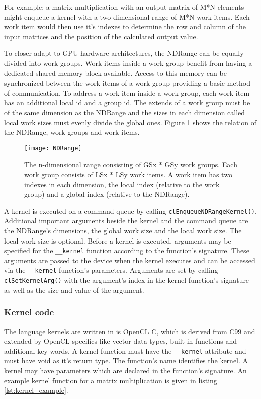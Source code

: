 For example: a matrix multiplication with an output matrix of M*N elements might enqueue a kernel with a two-dimensional range of M*N work items. Each work item would then use it's indexes to determine the row and column of the input matrices and the position of the calculated output value.

To closer adapt to GPU hardware architectures, the NDRange can be equally divided into work groups. Work items inside a work group benefit from having a dedicated shared memory block available. Access to this memory can be synchronized between the work items of a work group providing a basic method of communication. To address a work item inside a work group, each work item has an additional local id and a group id. The extends of a work group must be of the same dimension as the NDRange and the sizes in each dimension called local work sizes must evenly divide the global ones. Figure \ref{fig:NDRange} shows the relation of the NDRange, work groups and work items. \cite[p.18]{opencl_book}

\begin{figure} 
\centering
\texttt{[image: NDRange]}
\caption{The n-dimensional range consisting of GSx * GSy work groups. Each work group consists of LSx * LSy work items. A work item has two indexes in each dimension, the local index (relative to the work group) and a global index (relative to the NDRange).}
\label{fig:NDRange}
\end{figure}

A kernel is executed on a command queue by calling \lstinline!clEnqueueNDRangeKernel()!. Additional important arguments beside the kernel and the command queue are the NDRange's dimensions, the global work size and the local work size. The local work size is optional. Before a kernel is executed, arguments may be specified for the \lstinline!__kernel! function according to the function's signature. These arguments are passed to the device when the kernel executes and can be accessed via the \lstinline!__kernel! function's parameters. Arguments are set by calling \lstinline!clSetKernelArg()! with the argument's index in the kernel function's signature as well as the size and value of the argument.

\subsubsection{Kernel code}
The language kernels are written in is OpenCL C, which is derived from C99 and extended by OpenCL specifics like vector data types, built in functions and additional key words. A kernel function must have the \lstinline!__kernel! attribute and must have void as it's return type. The function's name identifies the kernel. A kernel may have parameters which are declared in the function's signature. An example kernel function for a matrix multiplication is given in listing \ref{lst:kernel_example}.

